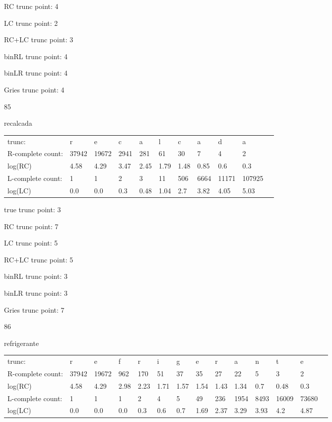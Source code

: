 \documentclass[10pt]{article}
\begin{document}
RC trunc point: 4

LC trunc point: 2

RC+LC trunc point: 3

binRL trunc point: 4

binLR trunc point: 4

Gries trunc point: 4

\newpage

85

recalcada

\begin{tabular}{l|llllllllll}
trunc: & r & e & c & a & l & c & a & d & a & \\ 
R-complete count: & 37942 & 19672 & 2941 & 281 & 61 & 30 & 7 & 4 & 2 & \\ 
log(RC) & 4.58 & 4.29 & 3.47 & 2.45 & 1.79 & 1.48 & 0.85 & 0.6 & 0.3 & \\ 
L-complete count: & 1 & 1 & 2 & 3 & 11 & 506 & 6664 & 11171 & 107925 & \\ 
log(LC) & 0.0 & 0.0 & 0.3 & 0.48 & 1.04 & 2.7 & 3.82 & 4.05 & 5.03 & \\ 
\end{tabular}

true trunc point: 3

RC trunc point: 7

LC trunc point: 5

RC+LC trunc point: 5

binRL trunc point: 3

binLR trunc point: 3

Gries trunc point: 7

\vspace{1em}

86

refrigerante

\begin{tabular}{l|lllllllllllll}
trunc: & r & e & f & r & i & g & e & r & a & n & t & e & \\ 
R-complete count: & 37942 & 19672 & 962 & 170 & 51 & 37 & 35 & 27 & 22 & 5 & 3 & 2 & \\ 
log(RC) & 4.58 & 4.29 & 2.98 & 2.23 & 1.71 & 1.57 & 1.54 & 1.43 & 1.34 & 0.7 & 0.48 & 0.3 & \\ 
L-complete count: & 1 & 1 & 1 & 2 & 4 & 5 & 49 & 236 & 1954 & 8493 & 16009 & 73680 & \\ 
log(LC) & 0.0 & 0.0 & 0.0 & 0.3 & 0.6 & 0.7 & 1.69 & 2.37 & 3.29 & 3.93 & 4.2 & 4.87 & \\ 
\end{tabular}
\end{document}

